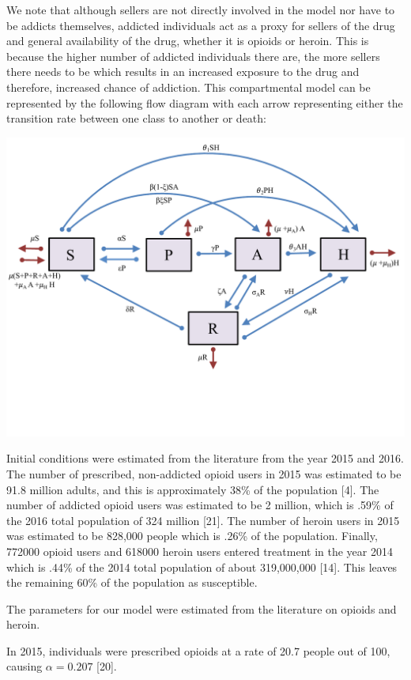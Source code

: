 \documentclass[12pt]{article}
\begin{document}
We note that although sellers are not directly involved in the model nor have to be addicts themselves, addicted individuals act as a proxy for sellers of the drug and general availability of the drug, whether it is opioids or heroin. This is because the higher number of addicted individuals there are, the more sellers there needs to be which results in an increased exposure to the drug and therefore, increased chance of addiction.  
This compartmental model can be represented by the following flow diagram with each arrow representing either the transition rate between one class to another or death: 

\includegraphics[scale=0.6]{heroin_schematic.pdf}

Initial conditions were estimated from the literature from the year 2015 and 2016. The number of prescribed, non-addicted opioid users in 2015 was estimated to be 91.8 million adults, and this is approximately 38\% of the population [4]. The number of addicted opioid users was estimated to be 2 million, which is .59\% of the 2016 total population of 324 million [21]. The number of heroin users in 2015 was estimated to be 828,000 people which is .26\% of the population. Finally, 772000 opioid users and 618000 heroin users entered treatment in the year 2014 which is .44\% of the 2014 total population of about 319,000,000 [14]. This leaves the remaining 60\% of the population as susceptible. 

The parameters for our model were estimated from the literature on opioids and heroin. 

In 2015, individuals were prescribed opioids at a rate of 20.7 people out of 100, causing $\alpha=0.207$ [20].
\end{document}
